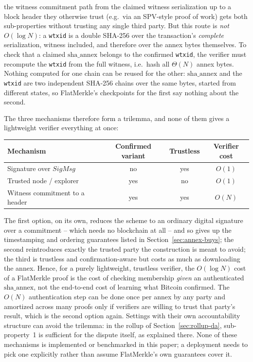 \begin{itemize}
  the witness commitment path from the claimed witness serialization up to
  a block header they otherwise trust (e.g.\ via an SPV-style proof of
  work) gets both sub-properties without trusting any single third party.
  But this route is \emph{not} $O(\log N)$: a \texttt{wtxid} is a double
  SHA-256 over the transaction's \emph{complete} serialization, witness
  included, and therefore over the annex bytes themselves. To check that a
  claimed $\mathrm{sha\_annex}$ belongs to the confirmed \texttt{wtxid}, the
  verifier must recompute the \texttt{wtxid} from the full witness, i.e.\
  hash all $\Theta(N)$ annex bytes. Nothing computed for one chain can be
  reused for the other: $\mathrm{sha\_annex}$ and the \texttt{wtxid} are two
  independent SHA-256 chains over the same bytes, started from different
  states, so FlatMerkle's checkpoints for the first say nothing about the
  second.
\end{itemize}
The three mechanisms therefore form a trilemma, and none of them gives a
lightweight verifier everything at once:
\begin{center}
\begin{tabular}{@{}lccc@{}}
\toprule
Mechanism & Confirmed variant & Trustless & Verifier cost \\
\midrule
Signature over $\mathit{SigMsg}$     & no  & yes & $O(1)$ \\
Trusted node / explorer              & yes & no  & $O(1)$ \\
Witness commitment to a header       & yes & yes & $O(N)$ \\
\bottomrule
\end{tabular}
\end{center}
The first option, on its own, reduces the scheme to an ordinary digital
signature over a commitment -- which needs no blockchain at all -- and so
gives up the timestamping and ordering guarantees listed in
Section~\ref{sec:annex-buys}; the second reintroduces exactly the trusted
party the construction is meant to avoid; the third is trustless and
confirmation-aware but costs as much as downloading the annex. Hence,
for a purely lightweight, trustless verifier, the $O(\log N)$ cost of a
FlatMerkle proof is the cost of checking membership \emph{given} an
authenticated $\mathrm{sha\_annex}$, not the end-to-end cost of learning
what Bitcoin confirmed. The $O(N)$ authentication step can be done once
per annex by any party and amortized across many proofs only if verifiers
are willing to trust that party's result, which is the second option
again. Settings with their own accountability structure can avoid the
trilemma: in the rollup of Section~\ref{sec:rollup-da}, sub-property~1 is
sufficient for the dispute itself, as explained there. None of these
mechanisms is implemented or benchmarked in this paper; a deployment needs
to pick one explicitly rather than assume FlatMerkle's own guarantees
cover it.

